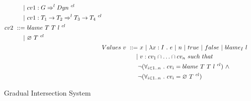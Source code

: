 \documentclass[a4paper]{article}
\begin{document}
\begin{figure}[H]
\begin{align*}
\begin{aligned}[t]
                                       |&\ cv1 : G \Rightarrow^l Dyn\ ^{cl}\\
                                       |&\ cv1 : T_1 \rightarrow T_2 \Rightarrow^l T_3 \rightarrow T_4\ ^{cl}\\
                                cv2\ ::=&\ blame\ T\ T\ l\ ^{cl}\\
                                       |&\ \varnothing\ T\ ^{cl} \end{aligned}\\
&Values\ \begin{aligned}[t] v\ ::=&\ x\ |\ \lambda x : I\ .\ e\ |\ n\ |\ true\ |\ false\ |\ blame_{I}\ l\\
                                 |&\ v : cv_1 \cap \ldots \cap cv_n\ such\ that\\
                                 &\neg(\forall_{i\in 1..n}\ .\ cv_i = blame\ T\ T\ l\ ^{cl})\ \land\\
                                 &\neg(\forall_{i\in 1..n}\ .\ cv_i = \varnothing\ T\ ^{cl}) \end{aligned}
\end{align*}
\hrulefill
\caption{Gradual Intersection System}
\label{intersection_syntax}
\end{figure}
\end{document}
